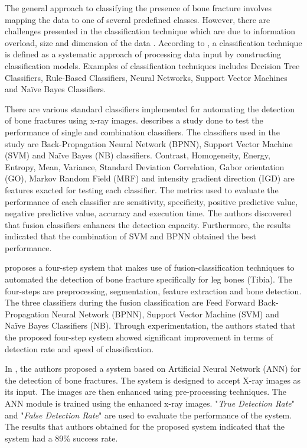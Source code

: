 \documentclass[11pt]{article}
\begin{document}
	The general approach to classifying the presence of bone fracture involves mapping the data to one of several predefined classes. However, there are challenges presented 
	in the classification technique which are due to information overload, size and dimension of the data \cite{Mahendran2011}. According to \cite{Mahendran2011}, a classification technique is defined as a systematic approach of processing data input by constructing classification models. Examples of classification techniques includes Decision Tree Classifiers, Rule-Based Classifiers, Neural Networks, Support Vector Machines and Na\"{i}ve Bayes Classifiers.
	
	There are various standard classifiers implemented for automating the detection of bone fractures using x-ray images. \cite{Mahendran2012} describes a study done to test the performance of single and combination classifiers. The classifiers used in the study are Back-Propagation Neural Network (BPNN), Support Vector Machine (SVM) and Na\"{i}ve Bayes (NB) classifiers. Contrast, Homogeneity, Energy, Entropy, Mean, Variance, Standard Deviation Correlation, Gabor orientation (GO), Markov Random Field (MRF) and intensity gradient direction (IGD) are features exacted for testing each classifier. The metrics used to evaluate the performance of each classifier are sensitivity, specificity, positive predictive value, negative predictive value, accuracy and execution time. The authors discovered that fusion classifiers enhances the detection capacity. Furthermore, the results indicated that the combination of SVM and BPNN obtained the best performance.
	
	\cite{mahendran_Enhanced} proposes a four-step system that makes use of fusion-classification techniques to automated the detection of bone fracture specifically for leg bones (Tibia). The four-steps are preprocessing, segmentation, feature extraction and bone detection. The three classifiers during the fusion classification are Feed Forward Back-Propagation Neural Network (BPNN), Support Vector Machine (SVM) and Na\"{i}ve Bayes Classifiers (NB). Through experimentation, the authors stated that the proposed four-step system showed significant improvement in terms of detection rate and speed of classification.
	
	In \cite{ComputerAidedBoneFractureDetection}, the authors proposed a system based on Artificial Neural Network (ANN) for the detection of bone fractures. The system is designed to accept X-ray images as its input. The images are then enhanced using pre-processing techniques. The ANN module is trained using the enhanced x-ray images. "\textit{True Detection Rate}" and "\textit{False Detection Rate}" are used to evaluate the performance of the system. The results that authors obtained for the proposed system indicated that the system had a 89\% success rate.
	
\end{document}
